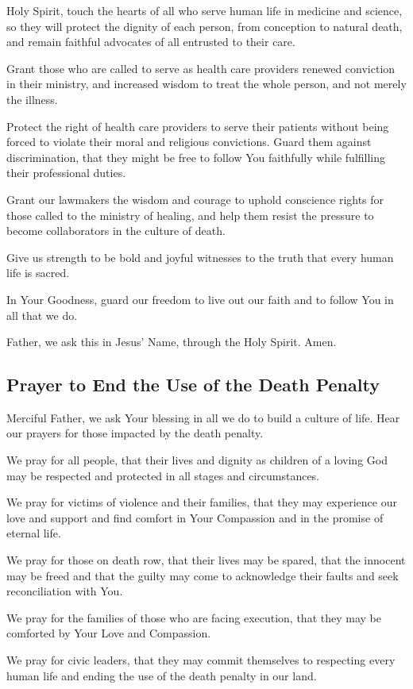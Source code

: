 \documentclass[12pt]{article}
\newcommand{\prayertitle}[1]{\subsection{#1}}
\begin{document}
Holy Spirit, touch the hearts of all who serve human life in medicine and science, so they will protect the dignity of each person, from conception to natural death, and remain faithful advocates of all entrusted to their care.  

Grant those who are called to serve as health care providers renewed conviction in their ministry, and increased wisdom to treat the whole person, and not merely the illness.

Protect the right of health care providers to serve their patients without being forced to violate their moral and religious convictions.
Guard them against discrimination, that they might be free to follow You faithfully while fulfilling their professional duties.

Grant our lawmakers the wisdom and courage to uphold conscience rights for those called to the ministry of healing, and help them resist the pressure to become collaborators in the culture of death.

Give us strength to be bold and joyful witnesses to the truth that every human life is sacred.

In Your Goodness, guard our freedom to live out our faith and to follow You in all that we do.

Father, we ask this in Jesus' Name, through the Holy Spirit. Amen.

\prayertitle{Prayer to End the Use of the Death Penalty}
Merciful Father, we ask Your blessing in all we do to build a culture of life.
Hear our prayers for those impacted by the death penalty.

We pray for all people, that their lives and dignity as children of a loving God may be respected and protected in all stages and circumstances.

We pray for victims of violence and their families, that they may experience our love and support and find comfort in Your Compassion and in the promise of eternal life.

We pray for those on death row, that their lives may be spared, that the innocent may be freed and that the guilty may come to acknowledge their faults and seek reconciliation with You.

We pray for the families of those who are facing execution, that they may be comforted by Your Love and Compassion.

We pray for civic leaders, that they may commit themselves to respecting every human life and ending the use of the death penalty in our land.
\end{document}
